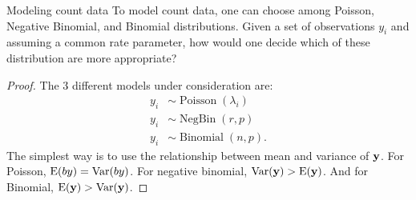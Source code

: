 \begin{problembox}{Modeling count data \hfill {\small \cite[3.5.b]{dobson2008introduction}}}{}
To model count data, one can choose among Poisson, Negative Binomial, and Binomial distributions. Given a set of observations $y_i$ and assuming a common rate parameter, how would one decide which of these distribution are more appropriate?
\end{problembox}

\begin{proof}
The 3 different models under consideration are:
\begin{align*}
	y_i &\sim \operatorname{Poisson}(\lambda_i)\\
	y_i &\sim \operatorname{NegBin}(r, p)\\
	y_i &\sim \operatorname{Binomial}(n, p).
\end{align*}
The simplest way is to use the relationship between mean and variance of $\mathbf{y}$. For Poisson, $\mathop{\rm E\,\!}\nolimits(by) = \mathop{\rm Var}\nolimits(by)$. For negative binomial, $\mathop{\rm Var}\nolimits(\mathbf{y}) > \mathop{\rm E\,\!}\nolimits(\mathbf{y})$. And for Binomial, $\mathop{\rm E\,\!}\nolimits(\mathbf{y}) > \mathop{\rm Var}\nolimits(\mathbf{y})$. 

\end{proof}



